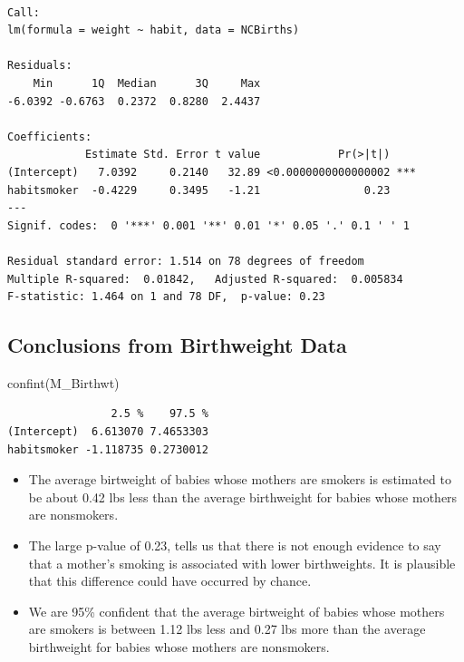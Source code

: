 \documentclass[
  letterpaper,
  DIV=11,
  numbers=noendperiod]{scrreprt}
\newenvironment{Shaded}{\begin{snugshade}}{\end{snugshade}}
\newcommand{\FunctionTok}[1]{\textcolor[rgb]{0.28,0.35,0.67}{#1}}
\newcommand{\NormalTok}[1]{\textcolor[rgb]{0.00,0.23,0.31}{#1}}
\begin{document}
\begin{verbatim}

Call:
lm(formula = weight ~ habit, data = NCBirths)

Residuals:
    Min      1Q  Median      3Q     Max 
-6.0392 -0.6763  0.2372  0.8280  2.4437 

Coefficients:
            Estimate Std. Error t value            Pr(>|t|)    
(Intercept)   7.0392     0.2140   32.89 <0.0000000000000002 ***
habitsmoker  -0.4229     0.3495   -1.21                0.23    
---
Signif. codes:  0 '***' 0.001 '**' 0.01 '*' 0.05 '.' 0.1 ' ' 1

Residual standard error: 1.514 on 78 degrees of freedom
Multiple R-squared:  0.01842,   Adjusted R-squared:  0.005834 
F-statistic: 1.464 on 1 and 78 DF,  p-value: 0.23
\end{verbatim}

\subsection{Conclusions from Birthweight
Data}\label{conclusions-from-birthweight-data}

\begin{Shaded}
\begin{Highlighting}[]
\FunctionTok{confint}\NormalTok{(M\_Birthwt)}
\end{Highlighting}
\end{Shaded}

\begin{verbatim}
                2.5 %    97.5 %
(Intercept)  6.613070 7.4653303
habitsmoker -1.118735 0.2730012
\end{verbatim}

\begin{itemize}
\item
  The average birtweight of babies whose mothers are smokers is
  estimated to be about 0.42 lbs less than the average birthweight for
  babies whose mothers are nonsmokers.
\item
  The large p-value of 0.23, tells us that there is not enough evidence
  to say that a mother's smoking is associated with lower birthweights.
  It is plausible that this difference could have occurred by chance.
\item
  We are 95\% confident that the average birtweight of babies whose
  mothers are smokers is between 1.12 lbs less and 0.27 lbs more than
  the average birthweight for babies whose mothers are nonsmokers.
\end{itemize}
\end{document}
